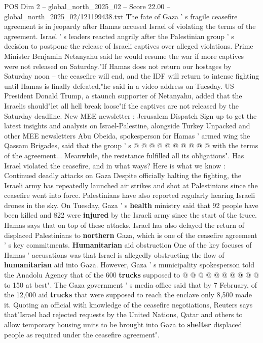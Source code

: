 \begin{textsample}{POS Dim 2 – global\_north\_2025\_02 – Score 22.00 – global\_north\_2025\_02/121199438.txt}  \label{ex:f2_pos_435}
The fate of Gaza ' s fragile ceasefire agreement is in jeopardy after Hamas accused Israel of violating the terms of the agreement.
Israel ' s leaders reacted angrily after the Palestinian group ' s decision to postpone the release of Israeli captives over alleged violations.
Prime Minister Benjamin Netanyahu said he would resume the war if more captives were not released on Saturday."If Hamas does not return our hostages by Saturday noon -- the ceasefire will end, and the IDF will return to intense fighting until Hamas is finally defeated,"he said in a video address on Tuesday.
US President Donald Trump, a staunch supporter of Netanyahu, added that the Israelis should"let all hell break loose"if the captives are not released by the Saturday deadline.
New MEE newsletter : Jerusalem Dispatch Sign up to get the latest insights and analysis on Israel-Palestine, alongside Turkey Unpacked and other MEE newsletters Abu Obeida, spokesperson for Hamas ' armed wing the Qassam Brigades, said that the group ' s @ @ @ @ @ @ @ @ @ @ with the terms of the agreement...
Meanwhile, the resistance fulfilled all its obligations".
Has Israel violated the ceasefire, and in what ways?
Here is what we know : Continued deadly attacks on Gaza Despite officially halting the fighting, the Israeli army has repeatedly launched air strikes and shot at Palestinians since the ceasefire went into force.
Palestinians have also reported regularly hearing Israeli drones in the sky.
On Tuesday, Gaza ' s \textbf{health} ministry said that 92 people have been killed and 822 were \textbf{injured} by the Israeli army since the start of the truce.
Hamas says that on top of these attacks, Israel has also delayed the return of displaced Palestinians to \textbf{northern} Gaza, which is one of the ceasefire agreement ' s key commitments. \textbf{Humanitarian} aid obstruction One of the key focuses of Hamas ' accusations was that Israel is allegedly obstructing the flow of \textbf{humanitarian} aid into Gaza.
However, Gaza ' s municipality spokesperson told the Anadolu Agency that of the 600 \textbf{trucks} supposed to @ @ @ @ @ @ @ @ @ @ to 150 at best".
The Gaza government ' s media office said that by 7 February, of the 12,000 aid \textbf{trucks} that were supposed to reach the enclave only 8,500 made it.
Quoting an official with knowledge of the ceasefire negotiations, Reuters says that"Israel had rejected requests by the United Nations, Qatar and others to allow temporary housing units to be brought into Gaza to \textbf{shelter} displaced people as required under the ceasefire agreement".

\end{textsample}
